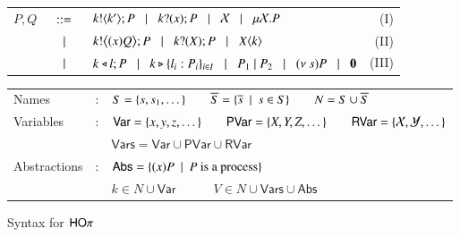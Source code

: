 \begin{figure}[t!]
		\begin{tabular}{lclr}
			$P,Q$
			&$\;\;::=\;\;$&	$k ! \langle k' \rangle ; P \;\;\;|\;\;\; k ? (x) ; P \;\;\;|\;\;\; \mathcal{X} \;\;\;|\;\;\; \mu \mathcal{X}. P$ & \qquad (\textsc{I})\\
			&$\;\;\;|\;\;\;$&	$k ! \big\langle (x)Q \big\rangle ; P \;\;\;|\;\;\; k ? (X) ; P \;\;\;|\;\;\; X\langle k \rangle$ & \qquad (\textsc{II})\\ 
			&$\;\;\;|\;\;\;$&	$k \triangleleft l ; P \;\;\;|\;\;\; k \triangleright \{l_i:P_i\}_{i \in I} \;\;\;|\;\;\; 
					P_1 \;|\; P_2 \;\;\;|\;\;\; (\nu\ s) P \;\;\;|\;\;\; \mathbf{0}$ & \qquad (\textsc{III})\\
		\end{tabular} 
		\begin{tabular}{lcl}
			Names & : & 	$S = \{s, s_1, \dots\} \qquad \overline{S} = \{\overline{s} \ \ |\ \  s \in S\} \qquad N = S \cup \overline{S}$\\
			Variables & : &	$\mathsf{Var} = \{x,y,z, \dots\} \qquad \mathsf{PVar} = \{X, Y, Z, \dots\}
					\qquad \mathsf{RVar} = \{\mathcal{X}, \mathcal{Y}, \dots\}$\\
				& &	$\mathsf{Vars} = \mathsf{Var} \cup \mathsf{PVar} \cup \mathsf{RVar}$\\
			Abstractions & : & $\mathsf{Abs} = \{(x)P \ \ |\ \  P \textrm{ is a process}\}$\\
				& &	$k \in N \cup \mathsf{Var} \quad \qquad V \in N \cup \mathsf{Vars} \cup \mathsf{Abs}$ 
		\end{tabular}
%
%

	\caption{Syntax for $\mathsf{HO}\pi$ \label{fig:syntax}}
\end{figure}

